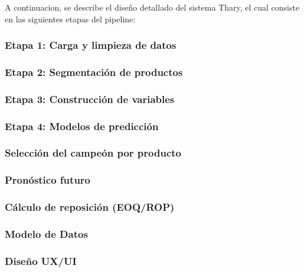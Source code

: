 A continuacion, se describe el diseño detallado del sistema Thary, el cual consiste en las siguientes etapas del pipeline:

\subsubsection{Etapa 1: Carga y limpieza de datos}


\subsubsection{Etapa 2: Segmentación de productos}


\subsubsection{Etapa 3: Construcción de variables}


\subsubsection{Etapa 4: Modelos de predicción}


\subsubsection{Selección del campeón por producto}


\subsubsection{Pronóstico futuro}


\subsubsection{Cálculo de reposición (EOQ/ROP)}


\subsubsection{Modelo de Datos}\label{sec:modelo_datos}


\subsubsection{Diseño UX/UI}
